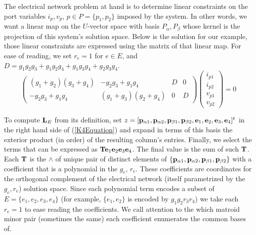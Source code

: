The electrical network problem at hand is to determine linear constraints on the
port variables $i_p, v_p$, $p\in P = \{p_1, p_2\}$ imposed by the system.  In other words,
we want a linear map on the $U$-vector space with basis $P_\alpha, P_\beta$ whose kernel
is the projection of this system's solution space.
Below is the solution for our example,
those linear constraints
are expressed using the matrix of that linear map.  For ease of reading,
we set $r_e=1$ for $e\in E$, and $D=g_{1} g_{2} g_{3} + g_{1} g_{2} g_{4} + g_{1} g_{3} g_{4} + g_{2} g_{3} g_{4}$.
\begin{equation}\label{K4Soln}
\left(\begin{array}{cccc}
{\left(g_{1} + g_{2}\right)} {\left(g_{3} + g_{4}\right)} & -g_{2} g_{3} + g_{1} g_{4} & D & 0 \\
-g_{2} g_{3} + g_{1} g_{4} & {\left(g_{1} + g_{3}\right)} {\left(g_{2} + g_{4}\right)} & 0 & D
\end{array}\right)
\left(\begin{array}{c} i_{p1} \\ i_{p2} \\ v_{p1} \\ v_{p2}
\end{array}\right) = 0
\end{equation}


To compute $\mathbf{L}_E$ from its definition, set 
$z=[\mathbf{p}_{\alpha 1},\mathbf{p}_{\alpha 2},\mathbf{p}_{\beta 1},\mathbf{p}_{\beta 2},
  \mathbf{e}_1,  \mathbf{e}_2,  \mathbf{e}_3,  \mathbf{e}_4]^t$
in the right hand side of (\ref{K4Equation}) 
and expand in terms of this basis
the exterior product (in order) of the resulting column's entries.
Finally, we select
the terms that can be expressed as $\mathbf{T}\mathbf{e}_1\mathbf{e}_2\mathbf{e}_3\mathbf{e}_4$.  The final
value is the sum of such $\mathbf{T}$.
Each $\mathbf{T}$ is the $\wedge$ of unique pair of distinct elements
of $\{\mathbf{p}_{\alpha 1}, \mathbf{p}_{\alpha 2}, \mathbf{p}_{\beta 1}, \mathbf{p}_{\beta 2}\}$
with a coefficient that is a polynomial in the 
$g_e$, $r_e$.  These coefficients are \Plucker coordinates
for the orthogonal complement of the electrical network
(itself parametrized by the $g_e, r_e$) solution space.
Since each polynomial
term encodes a subset of $E=\{e_1, e_2, e_3, e_4\}$ (for example, $\{e_1, e_2\}$ is encoded
by $g_1g_2r_3r_4$) we take each $r_e=1$ to ease reading the coefficients. We call attention
to the which matroid minor pair (sometimes the same) each coefficient enumerates
the common bases of.


